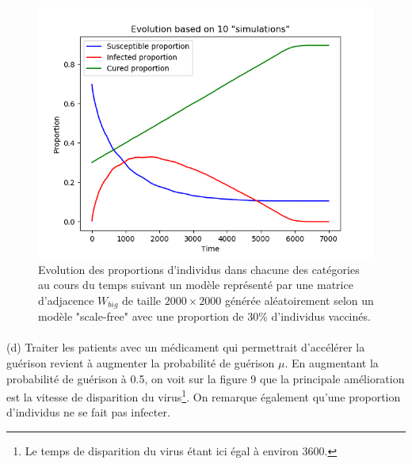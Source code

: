 \documentclass[a4paper, 12pt, oneside]{article}
\begin{document}
\begin{figure}[H]
	\centering
	\includegraphics[scale=1]{Wbig_dense_initial_immunised.png} 
	\caption{Evolution des proportions d'individus dans chacune des catégories au cours du temps suivant un modèle représenté par une matrice d'adjacence $W_{big}$ de taille $2000 \times 2000$ générée aléatoirement selon un modèle "scale-free" avec une proportion de 30\% d'individus vaccinés.}
\end{figure}

\paragraph{}(d) Traiter les patients avec un médicament qui permettrait d'accélérer la guérison revient à augmenter la probabilité de guérison $\mu$. En augmentant la probabilité de guérison à 0.5, on voit sur la figure 9 que la principale amélioration est la vitesse de disparition du virus\footnote{Le temps de disparition du virus étant ici égal à environ 3600.}. On remarque également qu'une proportion d'individus ne se fait pas infecter.
\end{document}
